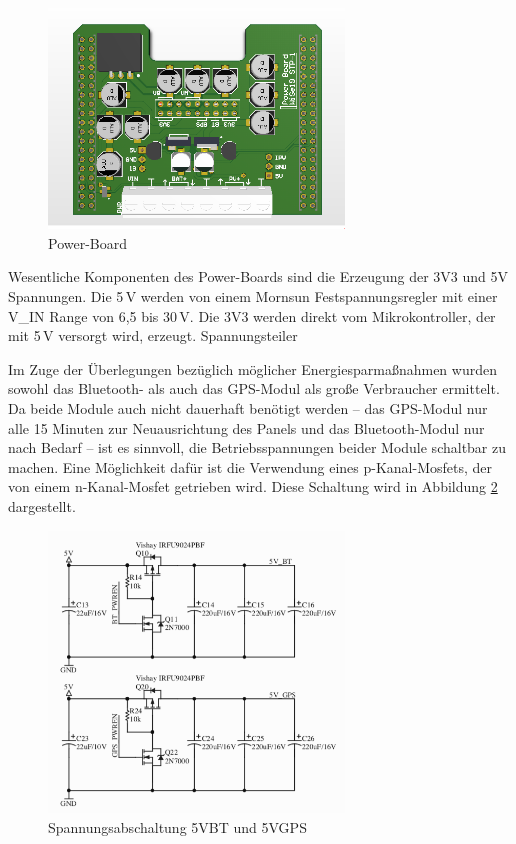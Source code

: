 \begin{figure}[H]
  \centering
  \includegraphics[width=0.7\textwidth]{./img/PCB_Power_3D_top.png}
  \caption{Power-Board}\label{fig.powerboard}
\end{figure}

Wesentliche Komponenten des Power-Boards sind die Erzeugung der 3V3 und 5V Spannungen. Die 5\,V werden von einem Mornsun Festspannungsregler mit einer V\_IN Range von 6,5 bis 30\,V.
Die 3V3 werden direkt vom Mikrokontroller, der mit 5\,V versorgt wird, erzeugt. Spannungsteiler

Im Zuge der Überlegungen bezüglich möglicher Energiesparmaßnahmen wurden sowohl das Bluetooth- als auch das GPS-Modul als große Verbraucher ermittelt. Da beide Module auch nicht dauerhaft benötigt werden -- das GPS-Modul nur alle 15 Minuten zur Neuausrichtung des Panels und das Bluetooth-Modul nur nach Bedarf -- ist es sinnvoll, die Betriebsspannungen beider Module schaltbar zu machen. Eine Möglichkeit dafür ist die Verwendung eines p-Kanal-Mosfets, der von einem n-Kanal-Mosfet getrieben wird. Diese Schaltung wird in Abbildung \ref{fig.spannungsabschaltung} dargestellt.

\begin{figure}[H]
  \centering
  \includegraphics[width=0.7\textwidth]{./img/spannungsabschaltung.png}
  \caption{Spannungsabschaltung 5VBT und 5VGPS}\label{fig.spannungsabschaltung}
\end{figure}

